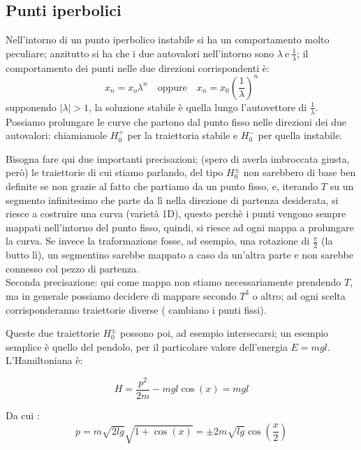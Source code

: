 \documentclass[a4paper,12pt]{article}
\theoremstyle{plain}
\theoremstyle{definition}
\newcommand{\f}[2]{\frac{#1}{#2}}
\newcommand{\econg}{~\text{e}~}
\theoremstyle{remark}
\begin{document}
\subsection{Punti iperbolici}
Nell'intorno di un punto iperbolico instabile si ha un comportamento molto peculiare; anzitutto si ha che i due autovalori nell'intorno sono $\lambda\econg\f{1}{\lambda}$; il comportamento dei punti nelle due direzioni corrispondenti è:
\[x_n=x_o \lambda^n\quad\text{oppure} \quad x_n =x_0\left({\f{1}{\lambda}}\right)^n		\]
supponendo $|\lambda|>1$, la soluzione stabile è quella lungo l'autovettore di $\f{1}{\lambda}$. Possiamo prolungare le curve che partono dal punto fisso nelle direzioni dei due autovalori: chiamiamole $H_0^+$ per la traiettoria stabile e $H_0^-$ per quella instabile.
\begin{obs}
Bisogna fare qui due importanti precisazioni; (spero di averla imbroccata giusta, però) le traiettorie di cui stiamo parlando, del tipo $H_0^{\pm}$ non sarebbero di base ben definite se non grazie al fatto che partiamo da un punto fisso, e, iterando $T$ su un segmento infinitesimo che parte da lì nella direzione di partenza desiderata, si riesce a costruire una curva (varietà 1D), questo perchè i punti vengono sempre mappati nell'intorno del punto fisso, quindi, si riesce ad ogni mappa a prolungare la curva. Se invece la traformazione fosse, ad esempio, una rotazione di $\f{\pi}{2}$ (la butto lì), un segmentino sarebbe mappato a caso da un'altra parte e non sarebbe connesso col pezzo di partenza.\\Seconda precisazione: qui come mappa non stiamo necessariamente prendendo $T$, ma in generale possiamo decidere di mappare secondo $T^3$ o altro; ad ogni scelta corrisponderanno traiettorie diverse ( cambiano i punti fissi). 


\end{obs}

Queste due traiettorie $H_0^{\pm}$ possono poi, ad esempio intersecarsi; un esempio semplice è quello del pendolo, per il particolare valore dell'energia $E=mgl$. L'Hamiltoniana è:

\[H=\f{p^2}{2m}-mgl\cos(x)=mgl		\]

Da cui :
\[p=m\sqrt{2lg}\sqrt{1+\cos(x)}=\pm2m\sqrt{lg}	\cos(\f{x}{2})		\]
\end{document}
